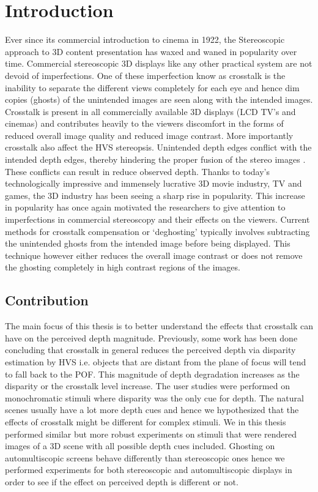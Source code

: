 \chapter{Introduction}
\label{chap:intro}

Ever since its commercial introduction to cinema in 1922, the Stereoscopic approach to 3D content presentation has waxed and waned in popularity over time. Commercial stereoscopic 3D displays like any other practical system are not devoid of imperfections. One of these imperfection know as crosstalk is the inability to separate the different views completely for each eye and hence dim copies (ghosts) of the unintended images are seen along with the intended images. Crosstalk is present in all commercially available 3D displays (LCD TV's and cinemas) and contributes heavily to the viewers discomfort in the forms of reduced overall image quality and reduced image contrast. More importantly crosstalk also affect the HVS stereopsis. Unintended depth edges conflict with the intended depth edges, thereby hindering the proper fusion of the stereo images \cite{tsirlin2012effect}. These conflicts can result in reduce observed depth. Thanks to today's technologically impressive and immensely lucrative 3D movie industry, TV and games, the 3D industry has been seeing a sharp rise in popularity. This increase in popularity has once again motivated the researchers to give attention to imperfections in commercial stereoscopy and their effects on the viewers. Current methods for crosstalk compensation or `deghosting' typically involves subtracting the unintended ghosts from the intended image before being displayed. This technique however either reduces the overall image contrast or does not remove the ghosting completely in high contrast regions of the images.


\section{Contribution}

The main focus of this thesis is to better understand the effects that crosstalk can have on the perceived depth magnitude. Previously, some work has been done \cite{tsirlin2012effect} concluding that crosstalk in general reduces the perceived depth via disparity estimation by HVS i.e. objects that are distant from the plane of focus will tend to fall back to the POF. This magnitude of depth degradation increases as the disparity or the crosstalk level increase. The user studies were performed on monochromatic stimuli where disparity was the only cue for depth. The natural scenes usually have a lot more depth cues and hence we hypothesized that the effects of crosstalk might be different for complex stimuli. We in this thesis performed similar but more robust experiments on stimuli that were rendered images of a 3D scene with all possible depth cues included. Ghosting on automultiscopic screens behave differently than stereoscopic ones hence we performed experiments for both stereoscopic and automultiscopic displays in order to see if the effect on perceived depth is different or not.


